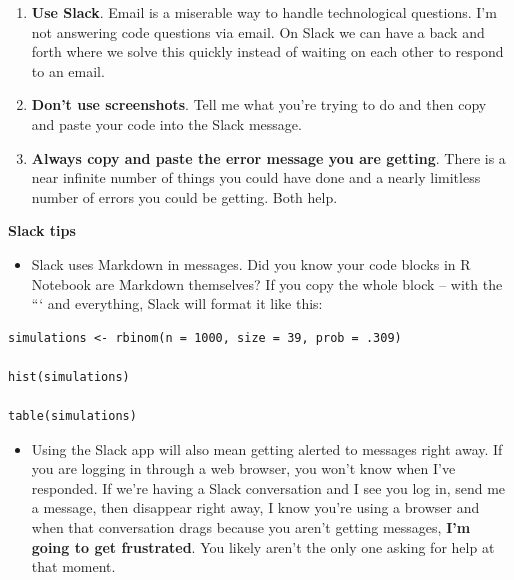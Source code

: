 \documentclass[]{book}
\providecommand{\tightlist}{%
  \setlength{\itemsep}{0pt}\setlength{\parskip}{0pt}}
\begin{document}
\begin{enumerate}
\def\labelenumi{\arabic{enumi}.}
\tightlist
\item
  \textbf{Use Slack}. Email is a miserable way to handle technological questions. I'm not answering code questions via email. On Slack we can have a back and forth where we solve this quickly instead of waiting on each other to respond to an email.
\item
  \textbf{Don't use screenshots}. Tell me what you're trying to do and then copy and paste your code into the Slack message.
\item
  \textbf{Always copy and paste the error message you are getting}. There is a near infinite number of things you could have done and a nearly limitless number of errors you could be getting. Both help.
\end{enumerate}

\textbf{Slack tips}

\begin{itemize}
\tightlist
\item
  Slack uses Markdown in messages. Did you know your code blocks in R Notebook are Markdown themselves? If you copy the whole block -- with the ``` and everything, Slack will format it like this:
\end{itemize}

\begin{verbatim}
simulations <- rbinom(n = 1000, size = 39, prob = .309)

hist(simulations)

table(simulations)
\end{verbatim}

\begin{itemize}
\tightlist
\item
  Using the Slack app will also mean getting alerted to messages right away. If you are logging in through a web browser, you won't know when I've responded. If we're having a Slack conversation and I see you log in, send me a message, then disappear right away, I know you're using a browser and when that conversation drags because you aren't getting messages, \textbf{I'm going to get frustrated}. You likely aren't the only one asking for help at that moment.
\end{itemize}


\end{document}
